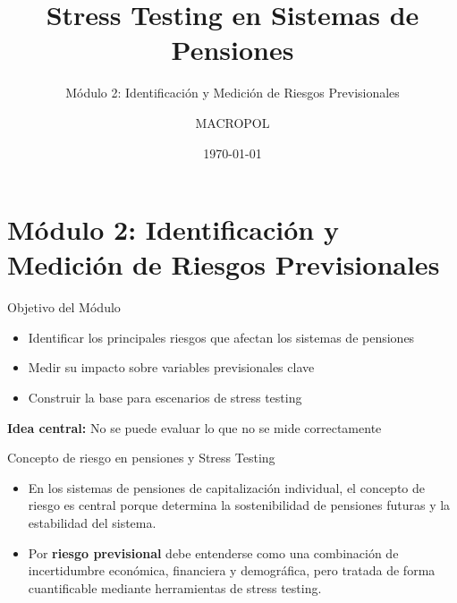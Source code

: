 \documentclass{beamer}
\title{Stress Testing en Sistemas de Pensiones}
\subtitle{Módulo 2: Identificación y Medición de Riesgos Previsionales}
\author{MACROPOL}
\date{\today}
\begin{document}
\frame{\titlepage}
\section{Módulo 2: Identificación y Medición de Riesgos Previsionales}

\begin{frame}[t]{Objetivo del Módulo}
\begin{itemize}

\item Identificar los principales riesgos que afectan los sistemas de pensiones
\item Medir su impacto sobre variables previsionales clave
\item Construir la base para escenarios de stress testing
\end{itemize}

\vspace{0.3cm}
\textbf{Idea central:} No se puede evaluar lo que no se mide correctamente
\end{frame}
\begin{frame}{Concepto de riesgo en pensiones y Stress Testing}
\begin{itemize}

    \item En los sistemas de pensiones de capitalización individual, el concepto de riesgo es central porque determina la sostenibilidad de pensiones futuras y la estabilidad del sistema.
    \vspace{0.3cm}
    \item Por \textbf{riesgo previsional} debe entenderse como una combinación de incertidumbre económica, financiera y demográfica, pero tratada de forma cuantificable mediante herramientas de stress testing.
\end{itemize}   
\end{frame}
\end{document}
